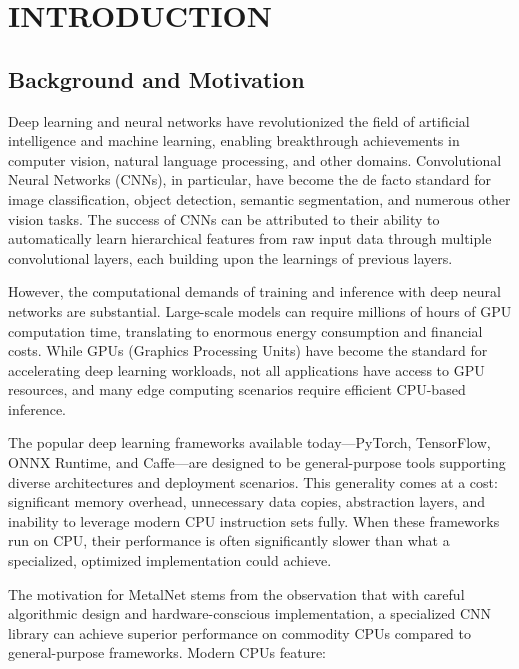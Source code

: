 \documentclass[12pt,oneside,a4paper]{report}
\begin{document}
\newpage

\chapter{INTRODUCTION}
\setcounter{page}{1}

\section{Background and Motivation}

Deep learning and neural networks have revolutionized the field of artificial intelligence and machine learning, enabling breakthrough achievements in computer vision, natural language processing, and other domains. Convolutional Neural Networks (CNNs), in particular, have become the de facto standard for image classification, object detection, semantic segmentation, and numerous other vision tasks. The success of CNNs can be attributed to their ability to automatically learn hierarchical features from raw input data through multiple convolutional layers, each building upon the learnings of previous layers.

However, the computational demands of training and inference with deep neural networks are substantial. Large-scale models can require millions of hours of GPU computation time, translating to enormous energy consumption and financial costs. While GPUs (Graphics Processing Units) have become the standard for accelerating deep learning workloads, not all applications have access to GPU resources, and many edge computing scenarios require efficient CPU-based inference.

The popular deep learning frameworks available today—PyTorch, TensorFlow, ONNX Runtime, and Caffe—are designed to be general-purpose tools supporting diverse architectures and deployment scenarios. This generality comes at a cost: significant memory overhead, unnecessary data copies, abstraction layers, and inability to leverage modern CPU instruction sets fully. When these frameworks run on CPU, their performance is often significantly slower than what a specialized, optimized implementation could achieve.

The motivation for MetalNet stems from the observation that with careful algorithmic design and hardware-conscious implementation, a specialized CNN library can achieve superior performance on commodity CPUs compared to general-purpose frameworks. Modern CPUs feature:
\end{document}
